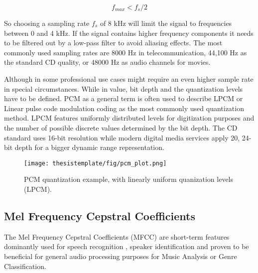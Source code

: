 \begin{equation*}
    f_{max} < f_s / 2
\end{equation*}

So choosing a sampling rate $f_s$ of 8 kHz will limit the signal to frequencies between 0 and 4 kHz. If the signal contains higher frequency components it needs to be filtered out by a low-pass filter to avoid aliasing effects.
The most commonly used sampling rates are 8000 Hz in telecommunication, 44,100 Hz as the standard CD quality, or 48000 Hz as audio channels for movies.


Although in some professional use cases might require an even higher sample rate in special circumstances. While in value, bit depth and the quantization levels  have to be defined. PCM as a general term is often used to describe LPCM or Linear pulse code modulation coding as the most commonly used  quantization method. LPCM features uniformly distributed levels for digitization purposes and the number of possible discrete values determined by the bit depth. The CD standard uses 16-bit resolution while modern digital media services apply 20, 24-bit depth for a bigger dynamic range representation.


\begin{figure}[ht!]
  \begin{center}
    \texttt{[image: thesistemplate/fig/pcm\_plot.png]}
    \caption{PCM quantization example, with linearly uniform quanization levels (LPCM).}
    \label{fig:pcm}
  \end{center}
\end{figure}



\subsection{Mel Frequency Cepstral Coefficients}

The Mel Frequency Cepstral Coefficients (MFCC) are short-term features dominantly used for speech recognition \cite{mfcc_logan2000mel}, speaker identification and proven to be beneficial for general audio processing purposes for Music Analysis or Genre Classification.

